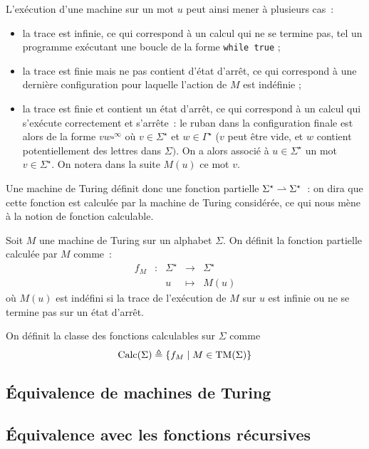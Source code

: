 L'exécution d'une machine sur un mot $u$ peut ainsi mener à plusieurs cas~:
\begin{itemize}
\item la trace est infinie, ce qui correspond à un calcul qui ne se termine pas,
  tel un programme exécutant une boucle de la forme \texttt{while true} ;
\item la trace est finie mais ne pas contient d'état d'arrêt, ce qui correspond
  à une dernière configuration pour laquelle l'action de $M$ est indéfinie ;
\item la trace est finie et contient un état d'arrêt, ce qui correspond à un
  calcul qui s'exécute correctement et s'arrête~: le ruban dans la configuration
  finale est alors de la forme $vw\square^\infty$ où $v \in \Sigma^\star$ et
  $w \in \Gamma^\star$ ($v$ peut être vide, et $w$ contient potentiellement
  des lettres dans $\Sigma)$. On a alors associé à $u\in\Sigma^\star$ un mot
  $v \in \Sigma^\star$. On notera dans la suite $M(u)$ ce mot $v$.
\end{itemize}

Une machine de Turing définit donc une fonction partielle
$\Sigma^\star \rightharpoonup \Sigma^\star$~: on dira que cette fonction est calculée
par la machine de Turing considérée, ce qui nous mène à la notion de fonction
calculable.

\begin{definition}
  Soit $M$ une machine de Turing sur un alphabet $\Sigma$. On définit la
  fonction partielle calculée par $M$ comme~:
  \[\begin{array}{ccccc}
  f_M & : & \Sigma^\star & \longrightarrow & \Sigma^\star\\
  & & u & \longmapsto & M(u)
  \end{array}\]
  où $M(u)$ est indéfini si la trace de l'exécution de $M$ sur $u$ est infinie
  ou ne se termine pas sur un état d'arrêt.
  
  On définit la classe des fonctions calculables sur $\Sigma$ comme
  \[\operatorname{Calc}(\Sigma)\triangleq \{ f_M\mid M \in \operatorname{TM}(\Sigma)\}\]
\end{definition}

\subsection{\'Equivalence de machines de Turing}

\subsection{\'Equivalence avec les fonctions récursives}

